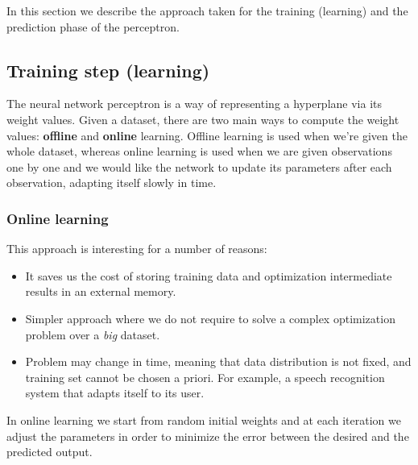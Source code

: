 In this section we describe the approach taken for the training (learning) and the prediction phase of the perceptron.

\subsection{Training step (learning)}

The neural network perceptron is a way of representing a hyperplane via its weight values. Given a dataset, there are two main ways to compute the weight values: \textbf{offline} and \textbf{online} learning. Offline learning is used when we're given the whole dataset, whereas online learning is used when we are given observations one by one and we would like the network to update its parameters after each observation, adapting itself slowly in time.\\

\subsubsection{Online learning}
This approach is interesting for a number of reasons:
\begin{itemize}
	\item It saves us the cost of storing training data and optimization intermediate results in an external memory.
	\item Simpler approach where we do not require to solve a complex optimization problem over a \textit{big} dataset.
	\item Problem may change in time, meaning that data distribution is not fixed, and training set cannot be chosen a priori. For example, a speech recognition system that adapts itself to its user.
\end{itemize}

In online learning we start from random initial weights and at each iteration we adjust the parameters in order to minimize the error between the desired and the predicted output.

